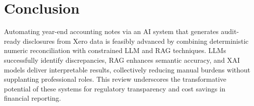 \section{Conclusion}
Automating year-end accounting notes via an AI system that generates audit-ready disclosures from Xero data is feasibly advanced by combining deterministic numeric reconciliation with constrained LLM and RAG techniques. LLMs successfully identify discrepancies, RAG enhances semantic accuracy, and XAI models deliver interpretable results, collectively reducing manual burdens without supplanting professional roles. This review underscores the transformative potential of these systems for regulatory transparency and cost savings in financial reporting.
